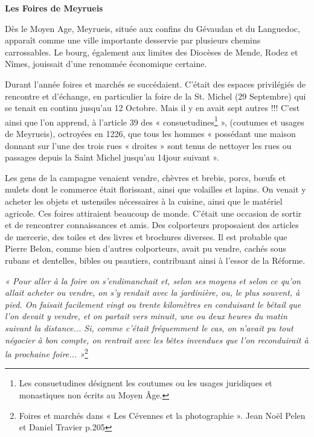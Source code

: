 


\begin{center}
{\Large\bfseries Les Foires de Meyrueis}
\end{center}

\vspace{0.75em}

Dès le Moyen Age, Meyrueis, située aux confins du Gévaudan et du Languedoc, apparaît comme une ville importante desservie par plusieurs chemins carrossables. Le bourg, également aux limites des Diocèses de Mende, Rodez et Nîmes, jouissait d’une renommée économique certaine.

Durant l’année foires et marchés se succédaient. C’était des espaces privilégiés de rencontre et d’échange, en particulier la foire de la St. Michel (29 Septembre) qui se tenait en continu jusqu’au 12 Octobre. Mais il y en avait sept autres !!!
C’est ainsi que l’on apprend, à l’article 39 des « consuetudines\footnote{Les consuetudines désignent les coutumes ou les usages juridiques et monastiques non écrits au Moyen Âge.} », (coutumes et usages de Meyrueis), octroyées en 1226, que tous les hommes « possédant une maison donnant sur l’une des trois rues « droites » sont tenus de nettoyer les rues ou passages depuis la Saint Michel jusqu’au 14\ieme jour suivant ».

Les gens de la campagne venaient vendre, chèvres et brebis, porcs, bœufs et mulets dont le commerce était florissant, ainsi que volailles et lapins. On venait y acheter les objets et ustensiles nécessaires à la cuisine, ainsi que le matériel agricole.
Ces foires attiraient beaucoup de monde. C’était une occasion de sortir et de rencontrer connaissances et amis. Des colporteurs proposaient des articles de mercerie, des toiles et des livres et brochures diverses. Il est probable que Pierre Belon, comme bien d’autres colporteurs, avait pu vendre, cachés sous rubans et dentelles, bibles ou psautiers, contribuant ainsi à l’essor de la Réforme.

\medskip

\textit{« Pour aller à la foire on s’endimanchait et, selon ses moyens et selon ce qu’on allait acheter ou vendre, on s’y rendait avec la jardinière, ou, le plus souvent, à pied. On faisait facilement vingt ou trente kilomètres en conduisant le bétail que l’on devait y vendre, et on partait vers minuit, une ou deux heures du matin suivant la distance... Si, comme c’était fréquemment le cas, on n’avait pu tout négocier à bon compte, on rentrait avec les bêtes invendues que l’on reconduirait à la prochaine foire... »}\footnote{Foires et marchés dans « Les Cévennes et la photographie ». Jean Noël Pelen et Daniel Travier p.205}


